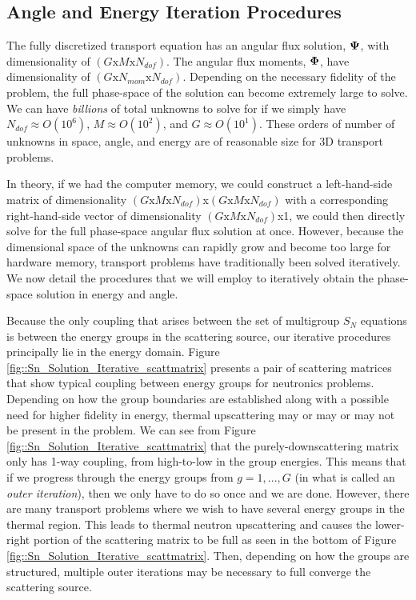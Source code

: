 \subsection{Angle and Energy Iteration Procedures}
\label{sec::Sn_Solution_Iterative}

The fully discretized transport equation has an angular flux solution, ${\bf \Psi}$, with dimensionality of $(G \text{x} M \text{x} N_{dof})$. The angular flux moments, ${\bf \Phi}$, have dimensionality of $(G \text{x} N_{mom} \text{x} N_{dof})$. Depending on the necessary fidelity of the problem, the full phase-space of the solution can become extremely large to solve. We can have {\em billions} of total unknowns to solve for if we simply have $N_{dof} \approx O(10^6)$, $M \approx O(10^2)$, and $G \approx O(10^1)$. These orders of number of unknowns in space, angle, and energy are of reasonable size for 3D transport problems.

In theory, if we had the computer memory, we could construct a left-hand-side matrix of dimensionality $(G \text{x} M \text{x} N_{dof})$x$(G \text{x} M \text{x} N_{dof})$ with a corresponding right-hand-side vector of dimensionality $(G \text{x} M \text{x} N_{dof})$x1, we could then directly solve for the full phase-space angular flux solution at once. However, because the dimensional space of the unknowns can rapidly grow and become too large for hardware memory, transport problems have traditionally been solved iteratively. We now detail the procedures that we will employ to iteratively obtain the phase-space solution in energy and angle.

Because the only coupling that arises between the set of multigroup $S_N$ equations is between the energy groups in the scattering source, our iterative procedures principally lie in the energy domain. Figure \ref{fig::Sn_Solution_Iterative_scattmatrix} presents a pair of scattering matrices that show typical coupling between energy groups for neutronics problems. Depending on how the group boundaries are established along with a possible need for higher fidelity in energy, thermal upscattering may or may or may not be present in the problem. We can see from Figure \ref{fig::Sn_Solution_Iterative_scattmatrix} that the purely-downscattering matrix only has 1-way coupling, from high-to-low in the group energies. This means that if we progress through the energy groups from $g=1,...,G$ (in what is called an {\em outer iteration}), then we only have to do so once and we are done. However, there are many transport problems where we wish to have several energy groups in the thermal region. This leads to thermal neutron upscattering and causes the lower-right portion of the scattering matrix to be full as seen in the bottom of Figure \ref{fig::Sn_Solution_Iterative_scattmatrix}. Then, depending on how the groups are structured, multiple outer iterations may be necessary to full converge the scattering source.


